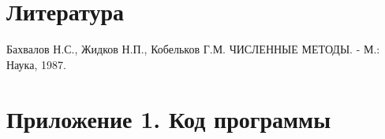 \documentclass[12pt, fleqn]{article}
\theoremstyle{definition}
\begin{document}
\section{Литература}
\begin{thebibliography}{}

 Бахвалов Н.С., Жидков Н.П., Кобельков Г.М. ЧИСЛЕННЫЕ МЕТОДЫ. - М.: Наука, 1987.
 
\end{thebibliography}
\newpage
\section{Приложение 1. Код программы}\label{sec:code}
{}
\end{document}
